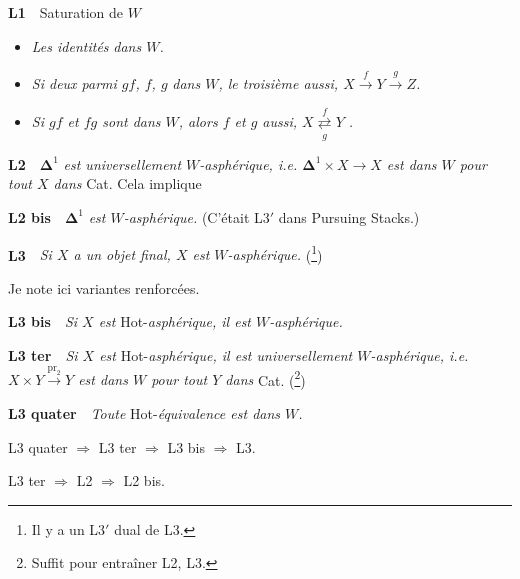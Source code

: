 \noindent\textbf{L1}\ \ Saturation de $W$

\begin{itemize}[leftmargin=2.5em]
\item[a)] \textit{Les identités} \textit{dans $W$.}
\item[b)] \textit{Si deux parmi $gf$, $f$, $g$} \textit{dans $W$, le troisième aussi, $X \xrightarrow{f} Y \xrightarrow{g} Z$.}
\item[c)] \textit{Si $gf$ et $fg$ sont dans $W$, alors $f$ et $g$ aussi, $X \overset{f}{\underset{g}{\rightleftarrows}} Y$ .}
\end{itemize}

\noindent\textbf{L2}\ \ $\mathbf{\Delta}^1$ \textit{est universellement $W$-asphérique, i.e. $\mathbf{\Delta}^1 \times X \longrightarrow X$ est dans $W$ pour tout $X$ dans} Cat. Cela implique

\noindent\textbf{L2 bis}\ \ $\mathbf{\Delta}^1$ \textit{est $W$-asphérique.} (C'était L3$'$ dans Pursuing Stacks.)

\noindent\textbf{L3}\ \ \textit{Si $X$ a un objet final, $X$ est $W$-asphérique.} (\footnote[1]{Il y a un L3$'$ dual de L3.})

\noindent Je note ici variantes renforcées.

\noindent\textbf{L3 bis}\ \ \textit{Si $X$ est} Hot-\textit{asphérique, il est $W$-asphérique.}

\noindent\textbf{L3 ter}\ \ \textit{Si $X$ est} Hot-\textit{asphérique, il est universellement $W$-asphérique, i.e. $X \times Y \xrightarrow{\mathrm{pr}_2} Y$ est dans $W$ pour tout $Y$ dans} Cat. (\footnote[2]{Suffit pour entraîner L2, L3.})

\clearpage

\noindent{}
\textbf{L3 quater}\ \ \textit{Toute} Hot-\textit{équivalence est dans $W$.}

\noindent L3 quater $\Longrightarrow$ L3 ter $\Longrightarrow$ L3 bis $\Longrightarrow$ L3.

\noindent L3 ter $\Longrightarrow$ L2 $\Longrightarrow$ L2 bis.

\noindent{}

